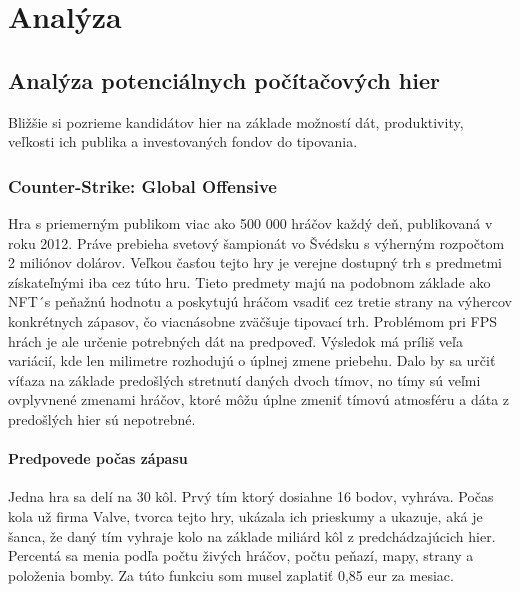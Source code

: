 
\chapter{Analýza}

\section{Analýza potenciálnych počítačových hier}
Bližšie si pozrieme kandidátov hier na základe možností dát, produktivity, veľkosti ich publika a investovaných fondov do tipovania.

\subsection{Counter-Strike: Global Offensive}
Hra s priemerným publikom viac ako 500 000 hráčov každý deň, publikovaná v roku 2012. Práve prebieha svetový šampionát vo Švédsku s výherným rozpočtom 2 miliónov dolárov. Veľkou časťou tejto hry je verejne dostupný trh s predmetmi získateľnými iba cez túto hru. Tieto predmety majú na podobnom základe ako NFT´s peňažnú hodnotu a poskytujú hráčom vsadiť cez tretie strany na výhercov konkrétnych zápasov, čo viacnásobne zväčšuje tipovací trh. Problémom pri FPS hrách je ale určenie potrebných dát na predpoveď. Výsledok má príliš veľa variácií, kde len milimetre rozhodujú o úplnej zmene priebehu. Dalo by sa určiť víťaza na základe predošlých stretnutí daných dvoch tímov, no tímy sú veľmi ovplyvnené zmenami hráčov, ktoré môžu úplne zmeniť tímovú atmosféru a dáta z predošlých hier sú nepotrebné.
 \subsubsection{Predpovede počas zápasu}
 Jedna hra sa delí na 30 kôl. Prvý tím ktorý dosiahne 16 bodov, vyhráva. Počas kola už firma Valve, tvorca tejto hry, ukázala ich prieskumy a ukazuje, aká je šanca, že daný tím vyhraje kolo na základe miliárd kôl z predchádzajúcich hier. Percentá sa menia podľa počtu živých hráčov, počtu peňazí, mapy, strany a položenia bomby. Za túto funkciu som musel zaplatiť 0,85 eur za mesiac.

